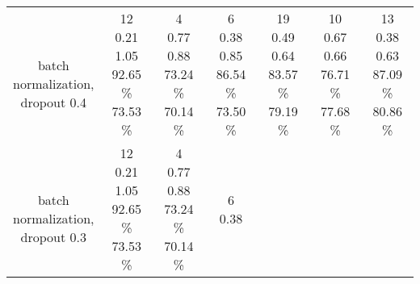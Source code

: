 \begin{center}
\begin{tabular}{ |c|c|c|c|c|c|c| }
{} \\
\hline
\thead{\\batch\\normalization,\\dropout 0.4} & \makecell{
12 \\
0.21 \\
1.05 \\
92.65 \% \\
73.53 \% \\
} & \makecell{
4 \\
0.77 \\
0.88 \\
73.24 \% \\
70.14 \% \\
} & \makecell{
6 \\
0.38 \\
0.85 \\
86.54 \% \\
73.50 \% \\
} & \makecell{
19 \\
0.49 \\
0.64 \\
83.57 \% \\
79.19 \% \\
} & \makecell{
10 \\
0.67 \\
0.66 \\
76.71 \% \\
77.68 \% \\
} & \makecell{
13 \\
0.38 \\
0.63 \\
87.09 \% \\
80.86 \% \\
} \\
\hline
\thead{\\batch\\normalization,\\dropout 0.3} & \makecell{
12 \\
0.21 \\
1.05 \\
92.65 \% \\
73.53 \% \\
} & \makecell{
4 \\
0.77 \\
0.88 \\
73.24 \% \\
70.14 \% \\
} & \makecell{
6 \\
0.38 \\
}
\end{tabular}
\end{center}
